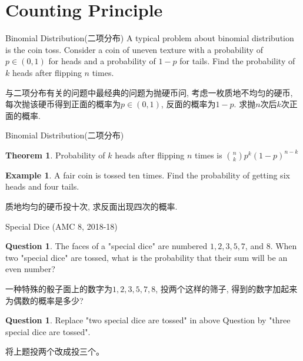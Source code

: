 \documentclass{beamer}
\theoremstyle{definition}
\newtheorem{theo}[defn]{Theorem}
\newtheorem{exam}[defn]{Example}
\newtheorem{ques}[defn]{Question}
\newenvironment{prooff}{{\noindent\it\textcolor{cyan!40!black}{Proof}:}\,}{\par}
\begin{document}
\section{Counting Principle}
\begin{frame}{Binomial Distribution(二项分布)}
    A typical problem about binomial distribution is the coin toss.
    Consider a coin of uneven texture with a probability of $p\in (0,1)$ for heads and a probability of $1-p$ for tails.
    Find the probability of $k$ heads after flipping $n$ times.

    与二项分布有关的问题中最经典的问题为抛硬币问, 考虑一枚质地不均匀的硬币, 每次抛该硬币得到正面的概率为$p\in (0,1)$, 反面的概率为$1-p$.
    求抛$n$次后$k$次正面的概率.
\end{frame}
\begin{frame}{Binomial Distribution(二项分布)}
    \begin{theo}
        Probability of $k$ heads after flipping $n$ times is $\binom{n}{k}p^k(1-p)^{n-k}$
    \end{theo}
    \begin{exam}
        A fair coin is tossed ten times. Find the probability of getting six heads and four tails.

        质地均匀的硬币投十次, 求反面出现四次的概率.
    \end{exam}
\end{frame}
\begin{frame}{Special Dice (AMC 8, 2018-18)}
    \begin{ques}
        The faces of a "special dice" are numbered $1,2,3,5,7$, and 8. When two "special dice" are tossed, what is the
        probability that their sum will be an even number?

        一种特殊的骰子面上的数字为$1,2,3,5,7,8$, 投两个这样的筛子, 得到的数字加起来为偶数的概率是多少?
    \end{ques}
    \begin{ques}
        Replace "two special dice are tossed" in above Question by "three special dice are tossed".

        将上题投两个改成投三个。
    \end{ques}
\end{frame}
\end{document}
